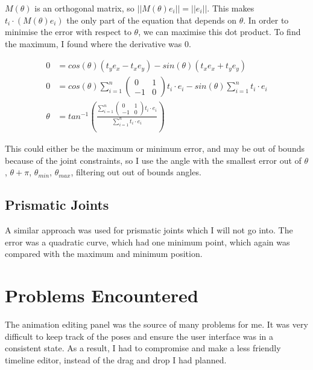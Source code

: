 \documentclass{article}
\begin{document}
    \(M(\theta)\) is an orthogonal matrix, so \(||M(\theta) e_i|| = ||e_i||\).
    This makes \(t_i \cdot (M(\theta) e_i)\) the only part of the equation that
    depends on \(\theta\). In order to minimise the error with respect to
    $\theta$, we can maximise this dot product. To find the maximum, I found
    where the derivative was $0$.

    \begin{align}
        0 &= cos(\theta) (t_y e_x - t_x e_y) - sin(\theta) (t_x e_x + t_y e_y) \\
        0 &= cos(\theta) \sum_{i=1}^n
            \left(\begin{smallmatrix}
                0 & 1 \\
                -1 & 0
            \end{smallmatrix}\right) t_i \cdot e_i - sin(\theta) \sum_{i=1}^n t_i \cdot e_i \\
        \theta &= tan^{-1}\left(\frac{\sum_{i=1}^n
            \left(\begin{smallmatrix}
                0 & 1 \\
                -1 & 0
            \end{smallmatrix}\right) t_i \cdot e_i}{\sum_{i=1}^n t_i \cdot e_i}\right)
    \end{align}

    This could either be the maximum or minimum error, and may be out of bounds
    because of the joint constraints, so I use the angle with the smallest error
    out of $\theta$, $\theta + \pi$, $\theta_{min}$, $\theta_{max}$, filtering
    out out of bounds angles.

    \subsection{Prismatic Joints}
    A similar approach was used for prismatic joints which I will not go into.
    The error was a quadratic curve, which had one minimum point, which again
    was compared with the maximum and minimum position.

    \section{Problems Encountered}
    The animation editing panel was the source of many problems for me. It was
    very difficult to keep track of the poses and ensure the user interface was
    in a consistent state. As a result, I had to compromise and make a less
    friendly timeline editor, instead of the drag and drop I had planned.
\end{document}
